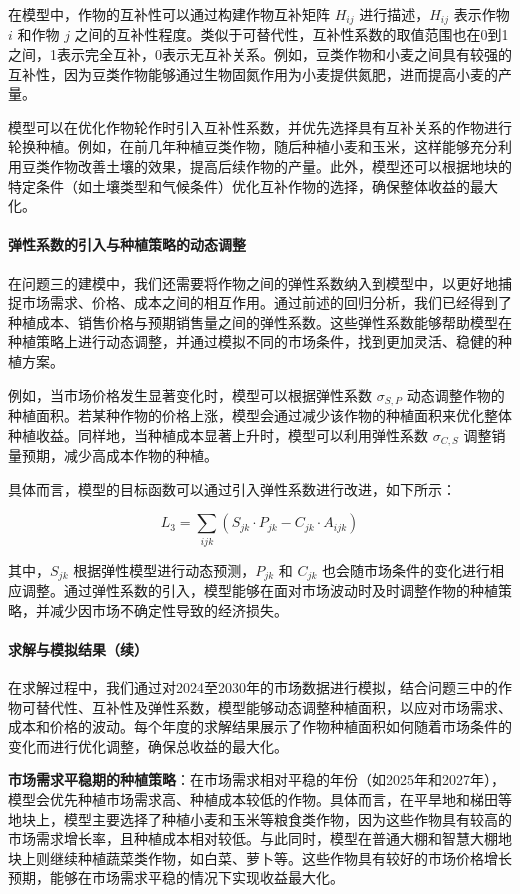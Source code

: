 \documentclass[12pt,a4paper]{nmmcm}
\begin{document}
在模型中，作物的互补性可以通过构建作物互补矩阵 $H_{ij}$ 进行描述，$H_{ij}$ 表示作物 $i$ 和作物 $j$ 之间的互补性程度。类似于可替代性，互补性系数的取值范围也在0到1之间，1表示完全互补，0表示无互补关系。例如，豆类作物和小麦之间具有较强的互补性，因为豆类作物能够通过生物固氮作用为小麦提供氮肥，进而提高小麦的产量。

模型可以在优化作物轮作时引入互补性系数，并优先选择具有互补关系的作物进行轮换种植。例如，在前几年种植豆类作物，随后种植小麦和玉米，这样能够充分利用豆类作物改善土壤的效果，提高后续作物的产量。此外，模型还可以根据地块的特定条件（如土壤类型和气候条件）优化互补作物的选择，确保整体收益的最大化。

\paragraph{弹性系数的引入与种植策略的动态调整}

在问题三的建模中，我们还需要将作物之间的弹性系数纳入到模型中，以更好地捕捉市场需求、价格、成本之间的相互作用。通过前述的回归分析，我们已经得到了种植成本、销售价格与预期销售量之间的弹性系数。这些弹性系数能够帮助模型在种植策略上进行动态调整，并通过模拟不同的市场条件，找到更加灵活、稳健的种植方案。

例如，当市场价格发生显著变化时，模型可以根据弹性系数 $\sigma_{S,P}$ 动态调整作物的种植面积。若某种作物的价格上涨，模型会通过减少该作物的种植面积来优化整体种植收益。同样地，当种植成本显著上升时，模型可以利用弹性系数 $\sigma_{C,S}$ 调整销量预期，减少高成本作物的种植。

具体而言，模型的目标函数可以通过引入弹性系数进行改进，如下所示：

\[
  L_3 = \sum_{ijk} \left( S_{jk} \cdot P_{jk} - C_{jk} \cdot A_{ijk} \right)
\]

其中，$S_{jk}$ 根据弹性模型进行动态预测，$P_{jk}$ 和 $C_{jk}$ 也会随市场条件的变化进行相应调整。通过弹性系数的引入，模型能够在面对市场波动时及时调整作物的种植策略，并减少因市场不确定性导致的经济损失。

\paragraph{求解与模拟结果（续）}

在求解过程中，我们通过对2024至2030年的市场数据进行模拟，结合问题三中的作物可替代性、互补性及弹性系数，模型能够动态调整种植面积，以应对市场需求、成本和价格的波动。每个年度的求解结果展示了作物种植面积如何随着市场条件的变化而进行优化调整，确保总收益的最大化。

\textbf{市场需求平稳期的种植策略}：在市场需求相对平稳的年份（如2025年和2027年），模型会优先种植市场需求高、种植成本较低的作物。具体而言，在平旱地和梯田等地块上，模型主要选择了种植小麦和玉米等粮食类作物，因为这些作物具有较高的市场需求增长率，且种植成本相对较低。与此同时，模型在普通大棚和智慧大棚地块上则继续种植蔬菜类作物，如白菜、萝卜等。这些作物具有较好的市场价格增长预期，能够在市场需求平稳的情况下实现收益最大化。
\end{document}
